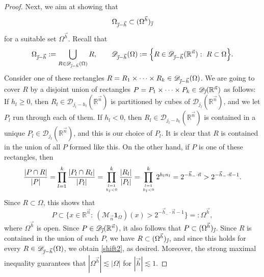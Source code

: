 \documentclass[11pt, reqno]{amsart}
\theoremstyle{definition}
\theoremstyle{remark}
\numberwithin{equation}{section}
\newcommand{\D}{\mathscr D}
\newcommand{\R}{\mathbb R}
\newcommand{\vh}{\vec h}
\newcommand{\vj}{\vec{\textit{\j}}}
\newcommand{\vn}{\vec n}
\newcommand{\one}{\mathbf{1}}
\newcommand{\abs}[1]{|#1|}
\begin{document}
\begin{proof}
Next, we aim at showing that
\begin{equation}\label{shift2}
\Omega_{\vj-\vh}\subset(\Omega^{\vh})_{\vj}
\end{equation}
for a suitable set $\Omega^{\vh}$. Recall that
\begin{equation*}
\Omega_{\vj-\vh}:=\bigcup_{R\in\D_{\vj-\vh}(\Omega)}R,\qquad
\D_{\vj-\vh}(\Omega):=\Big\{R\in\D_{\vj-\vh}(\R^{\vn}):\ R\subset \Omega\Big\}.
\end{equation*}
Consider one of these rectangles $R=R_1\times\cdots\times R_k\in\D_{\vj-\vh}(\Omega)$. We are going to cover $R$ by a disjoint union of rectangles $P=P_1\times\cdots\times P_k\in\D_{\vj}(\R^{\vn})$ as follows: If $h_l\geq 0$, then $R_l\in\D_{j_l-h_l}(\R^{\vn})$ is partitioned by cubes of $\D_{j_l}(\R^{\vn})$, and we let $P_l$ run through each of them. If $h_l<0$, then $R_l\in\D_{j_l-h_l}(\R^{\vn})$ is contained in a unique $P_l\in\D_{j_l}(\R^{\vn})$, and this is our choice of $P_l$. It is clear that $R$ is contained in the union of all $P$ formed like this. On the other hand, if $P$ is one of these rectangles, then
\begin{equation*}
\frac{\abs{P\cap R}}{\abs{P}}
=\prod_{l=1}^k\frac{\abs{P_l\cap R_l}}{\abs{P_l}}
=\prod_{\genfrac{}{}{0pt}{}{l=1}{h_l<0}}^k\frac{\abs{R_l}}{\abs{P_l}}
=\prod_{\genfrac{}{}{0pt}{}{l=1}{h_l<0}}^k 2^{h_l n_l}
=2^{-\vh_-\cdot\vn}
>2^{-\vh_-\cdot\vn-1}.
\end{equation*}
Since $R\subset\Omega$, this shows that
\begin{equation*}
P\subset \Big\{x\in\R^{\vn}:\ (\mathcal M_{\vn}\one_{\Omega})(x)
> 2^{-\vh_-\cdot\vn-1}\Big\}=:\Omega^{\vh},
\end{equation*}
where $\Omega^{\vh}$ is open. Since $P\in\D_{\vj}(\R^{\vn})$, it also follows that $P\subset (\Omega^{\vh})_{\vj}$. Since $R$ is contained in the union of such $P$, we have $R\subset (\Omega^{\vh})_{\vj}$, and since this holds for every $R\in\D_{\vj-\vh}(\Omega)$, we obtain \eqref{shift2}, as desired. Moreover, the strong maximal inequality guarantees that
$\abs{\Omega^{\vh}}\lesssim\abs{\Omega}$
for $\abs{\vh}\lesssim 1$.


\end{proof}
\end{document}
